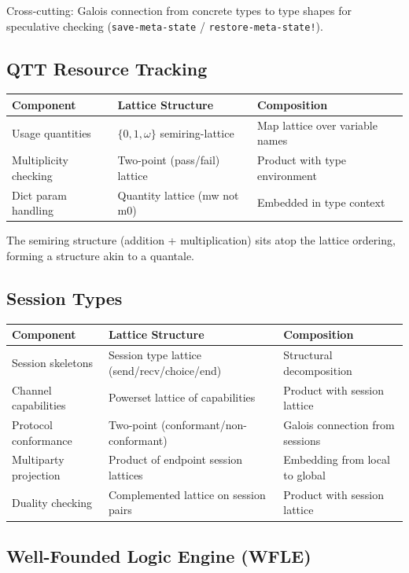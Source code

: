 \documentclass[11pt]{article}
\begin{document}
Cross-cutting: Galois connection from concrete types to type shapes for
speculative checking (\texttt{save-meta-state} / \texttt{restore-meta-state!}).
\subsection{QTT Resource Tracking}
\label{sec:orgc18bb35}

\begin{center}
\begin{tabular}{lll}
Component & Lattice Structure & Composition\\
\hline
Usage quantities & \(\{0, 1, \omega\}\) semiring-lattice & Map lattice over variable names\\
Multiplicity checking & Two-point (pass/fail) lattice & Product with type environment\\
Dict param handling & Quantity lattice (mw not m0) & Embedded in type context\\
\end{tabular}
\end{center}

The semiring structure (addition + multiplication) sits atop the lattice ordering,
forming a structure akin to a quantale.
\subsection{Session Types}
\label{sec:orga896fad}

\begin{center}
\begin{tabular}{lll}
Component & Lattice Structure & Composition\\
\hline
Session skeletons & Session type lattice (send/recv/choice/end) & Structural decomposition\\
Channel capabilities & Powerset lattice of capabilities & Product with session lattice\\
Protocol conformance & Two-point (conformant/non-conformant) & Galois connection from sessions\\
Multiparty projection & Product of endpoint session lattices & Embedding from local to global\\
Duality checking & Complemented lattice on session pairs & Product with session lattice\\
\end{tabular}
\end{center}
\subsection{Well-Founded Logic Engine (WFLE)}
\label{sec:org67bef09}
\end{document}
